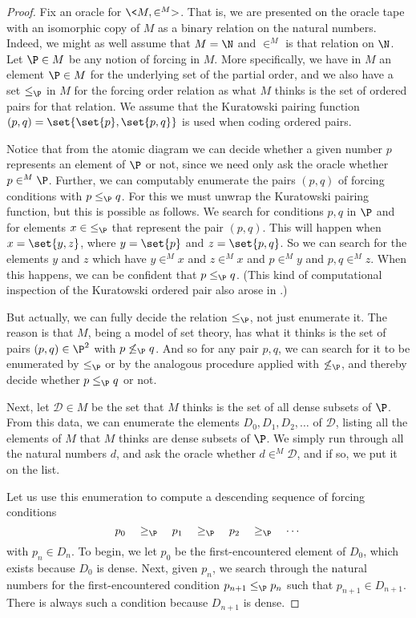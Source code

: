 \documentclass{amsart}
\begin{document}
 \begin{proof}
 Fix an oracle for $\<M,\in^M>$. That is, we are presented on the oracle tape with an isomorphic copy of $M$ as a binary relation on the natural numbers. Indeed, we might as well assume that $M=\N$ and $\in^M$ is that relation on $\N$. Let $\P\in M$ be any notion of forcing in $M$. More specifically, we have in $M$ an element $\P\in M$ for the underlying set of the partial order, and we also have a set $\leq_\P$ in $M$ for the forcing order relation as what $M$ thinks is the set of ordered pairs for that relation. We assume that the Kuratowski pairing function  $(p,q)=\set{\set{p},\set{p,q}}$ is used when coding ordered pairs.
 
 Notice that from the atomic diagram we can decide whether a given number $p$ represents an element of $\P$ or not, since we need only ask the oracle whether $p\in^M\P$. Further, we can computably enumerate the pairs $(p,q)$ of forcing conditions with $p\leq_\P q$. For this we must unwrap the Kuratowski pairing function, but this is possible as follows. We search for conditions $p,q$ in $\P$ and for elements $x\in{\leq_\P}$ that represent the pair $(p,q)$. This will happen when $x=\set{y,z}$, where $y=\set{p}$ and $z=\set{p,q}$. So we can search for the elements $y$ and $z$ which have $y\in^M x$ and $z\in^M x$ and $p\in^M y$ and $p,q\in^M z$. When this happens, we can be confident that $p\leq_\P q$. (This kind of computational inspection of the Kuratowski ordered pair also arose in \cite{GodziszewskiHamkins2017:Computable-quotient-presentations-of-models-of-arithmetic-and-set-theory}.)
 
 But actually, we can fully decide the relation $\leq_\P$, not just enumerate it. The reason is that $M$, being a model of set theory, has what it thinks is the set of pairs $(p,q)\in\P^2$ with $p\not\leq_\P q$. And so for any pair $p,q$, we can search for it to be enumerated by $\leq_\P$ or by the analogous procedure applied with $\not\leq_\P$, and thereby decide whether $p\leq_\P q$ or not.
 
 Next, let $\mathcal{D}\in M$ be the set that $M$ thinks is the set of all dense subsets of $\P$. From this data, we can enumerate the elements $D_0,D_1,D_2,\ldots$ of $\mathcal{D}$, listing all the elements of $M$ that $M$ thinks are dense subsets of $\P$. We simply run through all the natural numbers $d$, and ask the oracle whether $d\in^M \mathcal{D}$, and if so, we put it on the list.
 
 Let us use this enumeration to compute a descending sequence of forcing conditions
  $$p_0\quad\geq_\P\quad p_1\quad\geq_\P\quad p_2\quad\geq_\P\quad\cdots$$
 with $p_n\in D_n$. To begin, we let $p_0$ be the first-encountered element of $D_0$, which exists because $D_0$ is dense. Next, given $p_n$, we search through the natural numbers for the first-encountered condition $p_{n+1}\leq_\P p_n$ such that $p_{n+1}\in D_{n+1}$. There is always such a condition because $D_{n+1}$ is dense.
 

\end{proof}
\end{document}
